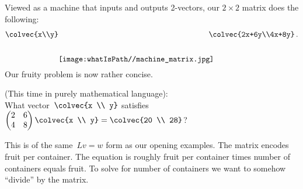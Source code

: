 Viewed as a machine that inputs and outputs 2-vectors, our $2\times2$ matrix does the following:
$$
\colvec{x\\y}\raisebox{-11mm}{\texttt{[image: \\whatIsPath//machine\_matrix.jpg]} }\!\!\!\!\!\!\colvec{2x+6y\\4x+8y}\, .
$$
Our fruity problem is now rather concise.
\begin{example}  (This time in purely mathematical language): \\[.2cm]
What vector~$  \colvec{x \\ y}$ satisfies 
$
    \begin{pmatrix}
      2     & 6 \\
      4     & 8
    \end{pmatrix}
  \colvec{x \\ y}
  =   \colvec{20 \\ 28}
$?
\end{example}
This is of the same~$Lv=w$ form as our opening examples. 
The matrix encodes fruit per container. The equation is roughly fruit per container times number of containers equals fruit. To solve for number of containers we want to \hypertarget{ch1divide}{somehow ``divide''} by the matrix. 


